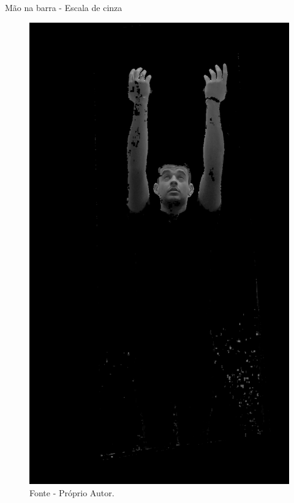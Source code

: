 \begin{frame}{Mão na barra - Escala de cinza}
    \begin{figure}[!ht]
    \centering
    \includegraphics[scale=0.1]{img/desenvolvimento/maoBarra/gray.png}
    \caption*{Fonte - Próprio Autor.}
    \end{figure}
\end{frame}

